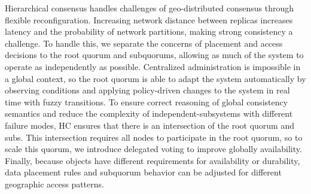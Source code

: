 \documentclass[10pt,conference]{IEEEtran}
\newcommand{\Hc}{Hierarchical consensus\xspace}
\newcommand{\subs}{subquorums\xspace}
\newcommand{\roo}{root quorum\xspace}
\begin{document}
\Hc handles challenges of geo-distributed consensus through flexible reconfiguration.
Increasing network distance between replicas increases latency and the probability of
network partitions, making strong consistency a challenge.
To handle this, we separate the concerns of placement and access decisions to the \roo
and \subs, allowing as much of the system to operate as independently as possible.
Centralized administration is impossible in a global context, so the \roo is able to
adapt the system automatically by observing conditions and applying policy-driven
changes to the system in real time with fuzzy transitions.
To ensure correct reasoning of global consistency semantics and reduce the complexity of
independent-subsystems with different failure modes, HC ensures that there is an
intersection of the \roo and subs.
This intersection requires all nodes to participate in the root quorum, so to scale
this quorum, we introduce delegated voting to improve globally availability.
Finally, because objects have different requirements for availability or durability,
data placement rules and subquorum behavior can be adjusted for different geographic
access patterns.





\end{document}
